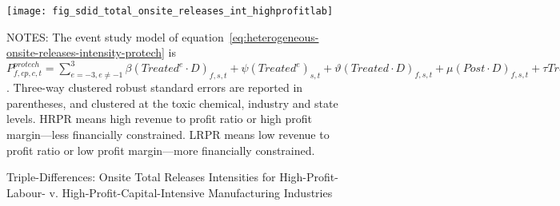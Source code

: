 \begin{figure}[H]
    \centering
    \texttt{[image: fig\_sdid\_total\_onsite\_releases\_int\_highprofitlab]}
    \caption{Triple-Differences: Onsite Total Releases Intensities for High-Profit-Labour- v. High-Profit-Capital-Intensive Manufacturing Industries}
    \label{fig:heterogeneous-onsite-releases-intensities-hpli}
    \begin{minipage}{\columnwidth}
        \vspace{0.05in}
        \tiny NOTES: The event study model of equation~\ref{eq:heterogeneous-onsite-releases-intensity-protech} is $P_{f,cp,c,t}^{protech} = \sum_{{e = -3},{e \neq -1}}^{3} \beta (Treated^{e} \cdot D)_{f,s,t} + \psi (Treated^{e})_{s,t} + \vartheta (Treated \cdot D)_{f,s,t} + \mu (Post \cdot D)_{f,s,t} + \tau Treated_{s,t} + \rho D_{f,s,t} + \alpha Post_{t} + \delta X_{v,c,t-1} + \omega F_{f,t} + \lambda_{t} + \gamma_{f} + \phi_{cp} + \zeta_{c} + \eta_{c,t} + \theta_{cp,t} + \varepsilon_{f,cp,c,t}$. Three-way clustered robust standard errors are reported in parentheses, and clustered at the toxic chemical, industry and state levels. HRPR means high revenue to profit ratio or high profit margin---less financially constrained. LRPR means low revenue to profit ratio or low profit margin---more financially constrained.
    \end{minipage}
\end{figure}